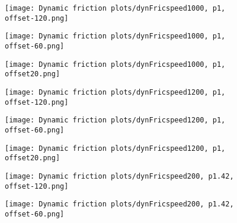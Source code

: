 \documentclass[12pt]{article}
\begin{document}
\begin{figure}[!h]
    \centering
    \begin{minipage}{0.49\textwidth}       
         \texttt{[image: Dynamic friction plots/dynFricspeed1000, p1, offset-120.png]}
    \end{minipage}
    \begin{minipage}{0.49\textwidth}       
         \texttt{[image: Dynamic friction plots/dynFricspeed1000, p1, offset-60.png]}
    \end{minipage}

\end{figure}
\begin{figure}[!h]
    \centering
    \begin{minipage}{0.49\textwidth}       
         \texttt{[image: Dynamic friction plots/dynFricspeed1000, p1, offset20.png]}
    \end{minipage}
    \begin{minipage}{0.49\textwidth}       
         \texttt{[image: Dynamic friction plots/dynFricspeed1200, p1, offset-120.png]}
    \end{minipage}

\end{figure}
\begin{figure}[!h]
    \centering
    \begin{minipage}{0.49\textwidth}       
         \texttt{[image: Dynamic friction plots/dynFricspeed1200, p1, offset-60.png]}
    \end{minipage}
    \begin{minipage}{0.49\textwidth}       
         \texttt{[image: Dynamic friction plots/dynFricspeed1200, p1, offset20.png]}
    \end{minipage}

\end{figure}

\begin{figure}[!h]
    \centering
    \begin{minipage}{0.49\textwidth}       
         \texttt{[image: Dynamic friction plots/dynFricspeed200, p1.42, offset-120.png]}
    \end{minipage}
    \begin{minipage}{0.49\textwidth}       
         \texttt{[image: Dynamic friction plots/dynFricspeed200, p1.42, offset-60.png]}
    \end{minipage}

\end{figure}
\end{document}
